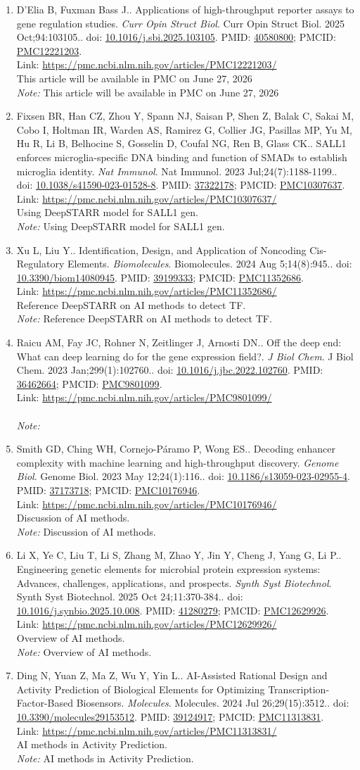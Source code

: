 \documentclass[12pt]{article}
\newcommand{\Pub}[9]{%
  \item #1. #2. \textit{#3}. #4. doi: \href{https://doi.org/#5}{#5}. PMID: \href{https://pubmed.ncbi.nlm.nih.gov/#6/}{#6}; PMCID: \href{https://www.ncbi.nlm.nih.gov/pmc/articles/#7/}{#7}. \\
  \noindent Link: \url{#8}\\
  \ifx#9\relax\else\\\textit{Note:} #9\fi
}
\begin{document}
\begin{enumerate}[leftmargin=*,label=\textbf{\arabic*.}]
\Pub{D'Elia B, Fuxman Bass J.}{Applications of high-throughput reporter assays to gene regulation studies}{Curr Opin Struct Biol}{Curr Opin Struct Biol. 2025 Oct;94:103105.}{10.1016/j.sbi.2025.103105}{40580800}{PMC12221203}{https://pmc.ncbi.nlm.nih.gov/articles/PMC12221203/}{This article will be available in PMC on June 27, 2026 }

\newpage

\Pub{Fixsen BR, Han CZ, Zhou Y, Spann NJ, Saisan P, Shen Z, Balak C, Sakai M, Cobo I, Holtman IR, Warden AS, Ramirez G, Collier JG, Pasillas MP, Yu M, Hu R, Li B, Belhocine S, Gosselin D, Coufal NG, Ren B, Glass CK.}{SALL1 enforces microglia-specific DNA binding and function of SMADs to establish microglia identity}{Nat Immunol}{Nat Immunol. 2023 Jul;24(7):1188-1199.}{10.1038/s41590-023-01528-8}{37322178}{PMC10307637}{https://pmc.ncbi.nlm.nih.gov/articles/PMC10307637/}{Using DeepSTARR model for SALL1 gen.}

\Pub{Xu L, Liu Y.}{Identification, Design, and Application of Noncoding Cis-Regulatory Elements}{Biomolecules}{Biomolecules. 2024 Aug 5;14(8):945.}{10.3390/biom14080945}{39199333}{PMC11352686}{https://pmc.ncbi.nlm.nih.gov/articles/PMC11352686/}{Reference DeepSTARR on AI methods to detect TF.}

\Pub{Raicu AM, Fay JC, Rohner N, Zeitlinger J, Arnosti DN.}{Off the deep end: What can deep learning do for the gene expression field?}{J Biol Chem}{J Biol Chem. 2023 Jan;299(1):102760.}{10.1016/j.jbc.2022.102760}{36462664}{PMC9801099}{https://pmc.ncbi.nlm.nih.gov/articles/PMC9801099/}{}

\Pub{Smith GD, Ching WH, Cornejo-Páramo P, Wong ES.}{Decoding enhancer complexity with machine learning and high-throughput discovery}{Genome Biol}{Genome Biol. 2023 May 12;24(1):116.}{10.1186/s13059-023-02955-4}{37173718}{PMC10176946}{https://pmc.ncbi.nlm.nih.gov/articles/PMC10176946/}{Discussion of AI methods.}

\Pub{Li X, Ye C, Liu T, Li S, Zhang M, Zhao Y, Jin Y, Cheng J, Yang G, Li P.}{Engineering genetic elements for microbial protein expression systems: Advances, challenges, applications, and prospects}{Synth Syst Biotechnol}{Synth Syst Biotechnol. 2025 Oct 24;11:370-384.}{10.1016/j.synbio.2025.10.008}{41280279}{PMC12629926}{https://pmc.ncbi.nlm.nih.gov/articles/PMC12629926/}{Overview of AI methods.}

\Pub{Ding N, Yuan Z, Ma Z, Wu Y, Yin L.}{AI-Assisted Rational Design and Activity Prediction of Biological Elements for Optimizing Transcription-Factor-Based Biosensors}{Molecules}{Molecules. 2024 Jul 26;29(15):3512.}{10.3390/molecules29153512}{39124917}{PMC11313831}{https://pmc.ncbi.nlm.nih.gov/articles/PMC11313831/}{AI methods in Activity Prediction.}


\end{enumerate}
\end{document}

